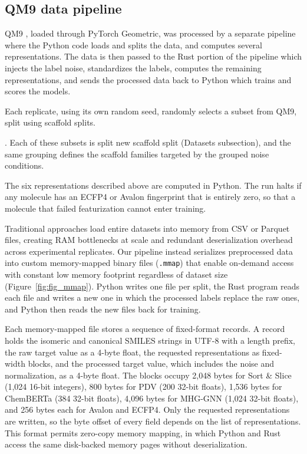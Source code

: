 \subsection{QM9 data pipeline}

QM9 \citep{Ramakrishnan2014}, loaded through PyTorch Geometric, was processed by a separate pipeline where the Python code loads and splits the data, and computes several representations. The data is then passed to the Rust portion of the pipeline which injects the label noise, standardizes the labels, computes the remaining representations, and sends the processed data back to Python which trains and scores the models. 

Each replicate, using its own random seed, randomly selects a subset from QM9, split using scaffold splits. 

. Each of these subsets is split new scaffold split (Datasets subsection), and the same grouping defines the scaffold families targeted by the grouped noise conditions.

The six representations described above are computed in Python. The run halts if any molecule has an ECFP4 or Avalon fingerprint
that is entirely zero, so that a molecule that failed featurization cannot enter training.

Traditional approaches load entire datasets into memory from CSV or Parquet files, creating RAM bottlenecks at scale and redundant deserialization overhead across experimental replicates. Our pipeline instead serializes preprocessed data into custom memory-mapped binary files (\texttt{.mmap}) that enable on-demand access with constant low memory footprint regardless of dataset size (Figure~\ref{fig:fig_mmap}). Python writes one file per split, the Rust program reads each file and writes a new one in which the processed labels replace the raw ones, and Python then reads the new files back for training.

Each memory-mapped file stores a sequence of fixed-format records. A record holds the isomeric and canonical SMILES strings in UTF-8 with a length prefix, the raw target value as a 4-byte float, the requested representations as fixed-width blocks, and the processed target value, which includes the noise and normalization, as a 4-byte float. The blocks occupy 2,048 bytes for Sort \& Slice (1,024 16-bit integers), 800 bytes for PDV (200 32-bit floats), 1,536 bytes for ChemBERTa (384 32-bit floats), 4,096 bytes for MHG-GNN (1,024 32-bit floats), and 256 bytes each for Avalon and ECFP4. Only the requested representations are written, so the byte offset of every field depends on the list of representations. This format permits zero-copy memory mapping, in which Python and Rust access the same disk-backed memory pages without deserialization.

